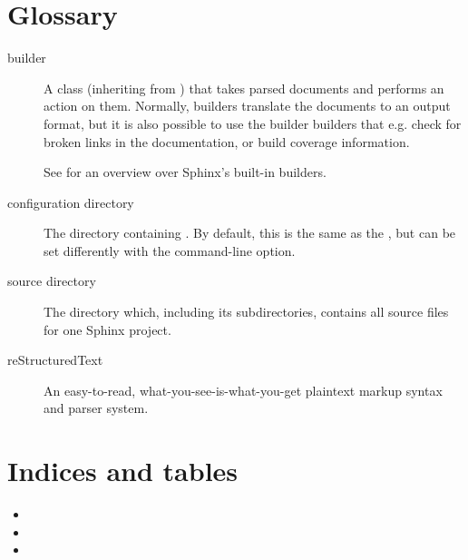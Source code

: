 \documentclass[letterpaper,10pt,french]{sphinxmanual}
\begin{document}
\chapter{Glossary}
\label{\detokenize{glossary:id1}}\label{\detokenize{glossary::doc}}\label{\detokenize{glossary:glossary}}\begin{description}
\item[{builder}] \leavevmode{}\label{\detokenize{glossary:term-builder}}
A class (inheriting from ) that takes
parsed documents and performs an action on them.  Normally, builders
translate the documents to an output format, but it is also possible to
use the builder builders that e.g. check for broken links in the
documentation, or build coverage information.

See {\hyperref[\detokenize{glossary::doc}]{}} for an overview over Sphinx’s built-in
builders.

\item[{configuration directory}] \leavevmode{}\label{\detokenize{glossary:term-configuration-directory}}
The directory containing .  By default, this is the same as
the {\hyperref[\detokenize{glossary:term-source-directory}]{}}, but can be set differently with the 
command-line option.

\item[{source directory}] \leavevmode{}\label{\detokenize{glossary:term-source-directory}}
The directory which, including its subdirectories, contains all source
files for one Sphinx project.

\item[{reStructuredText}] \leavevmode{}\label{\detokenize{glossary:term-restructuredtext}}
An easy-to-read, what-you-see-is-what-you-get plaintext markup syntax and
parser system.

\end{description}


\chapter{Indices and tables}
\label{\detokenize{index:indices-and-tables}}\begin{itemize}
\item {} 

\item {} 

\item {} 

\end{itemize}



\renewcommand{\indexname}{Index}
\printindex
\end{document}
